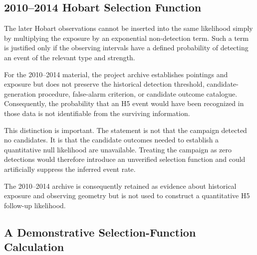 \documentclass[twocolumn]{aastex701}
\begin{document}
\subsection{2010--2014 Hobart Selection Function}

The later Hobart observations cannot be inserted into the same likelihood simply by multiplying the exposure by an exponential non-detection term. Such a term is justified only if the observing intervals have a defined probability of detecting an event of the relevant type and strength.

For the 2010--2014 material, the project archive establishes pointings and exposure but does not preserve the historical detection threshold, candidate-generation procedure, false-alarm criterion, or candidate outcome catalogue. Consequently, the probability that an H5 event would have been recognized in those data is not identifiable from the surviving information.

This distinction is important. The statement is not that the campaign detected no candidates. It is that the candidate outcomes needed to establish a quantitative null likelihood are unavailable. Treating the campaign as zero detections would therefore introduce an unverified selection function and could artificially suppress the inferred event rate.

The 2010--2014 archive is consequently retained as evidence about historical exposure and observing geometry but is not used to construct a quantitative H5 follow-up likelihood.

\subsection{A Demonstrative Selection-Function Calculation}
\label{sec:seldemo}
\end{document}

